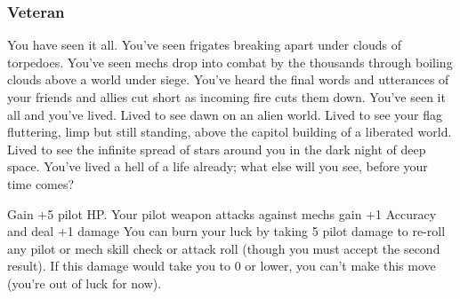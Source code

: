 \subsubsection{Veteran}

\begin{talent}
{You have seen it all. You’ve seen frigates breaking apart under clouds of torpedoes. You’ve seen mechs drop into combat by the thousands through boiling clouds above a world under siege. You’ve heard the final words and utterances of your friends and allies cut short as incoming fire cuts them down. You’ve seen it all and you’ve lived. Lived to see dawn on an alien world. Lived to see your flag fluttering, limp but still standing, above the capitol building of a liberated world. Lived to see the infinite spread of stars around you in the dark night of deep space. You’ve lived a hell of a life already; what else will you see, before your time comes?}

Gain +5 pilot HP. 
Your pilot weapon attacks against mechs gain +1 Accuracy and deal +1 damage 
You can burn your luck by taking 5 pilot damage to re-roll any pilot or mech skill check or attack roll (though you must accept the second result). If this damage would take you to 0 or lower, you can’t make this move (you’re out of luck for now).
\end{talent}